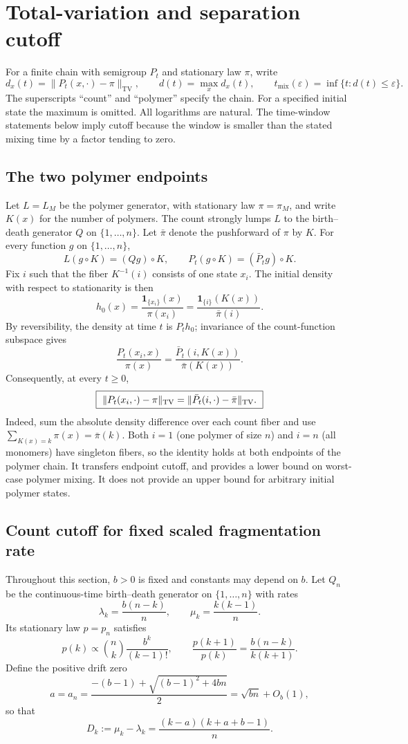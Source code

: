 \section{Total-variation and separation cutoff}\label{sec:count-cutoff}

For a finite chain with semigroup $P_t$ and stationary law $\pi$, write
\[
 d_x(t)=\|P_t(x,\cdot)-\pi\|_{\mathrm{TV}},\qquad
 d(t)=\max_x d_x(t),\qquad
 t_{\mathrm{mix}}(\varepsilon)=\inf\{t:d(t)\le\varepsilon\}.
\]
The superscripts ``count'' and ``polymer'' specify the chain. For a
specified initial state the maximum is omitted. All logarithms are
natural. The time-window statements below imply cutoff because the
window is smaller than the stated mixing time by a factor tending to
zero.

\subsection{The two polymer endpoints}
Let $L=L_M$ be the polymer generator, with stationary law $\pi=\pi_M$,
and write $K(x)$ for the number of polymers. The count strongly lumps
$L$ to the birth--death generator $Q$ on $\{1,\ldots,n\}$. Let $\bar\pi$ denote the pushforward of $\pi$ by $K$.
For every function $g$ on $\{1,\ldots,n\}$,
\[
 L(g\circ K)=(Qg)\circ K,
 \qquad P_t(g\circ K)=(\bar P_tg)\circ K.
\]
Fix $i$ such that the fiber $K^{-1}(i)$ consists of one state $x_i$.
The initial density with respect to stationarity is then
\[
 h_0(x)=\frac{\mathbf1_{\{x_i\}}(x)}{\pi(x_i)}
       =\frac{\mathbf1_{\{i\}}(K(x))}{\bar\pi(i)}.
\]
By reversibility, the density at time $t$ is $P_th_0$; invariance of the
count-function subspace gives
\[
 \frac{P_t(x_i,x)}{\pi(x)}
 =\frac{\bar P_t(i,K(x))}{\bar\pi(K(x))}.
\]
Consequently, at every $t\geq0$,
\[
 \boxed{\ \|P_t(x_i,\cdot)-\pi\|_{\rm TV}
       =\|\bar P_t(i,\cdot)-\bar\pi\|_{\rm TV}.\ }
\]
Indeed, sum the absolute density difference over each count fiber and use
$\sum_{K(x)=k}\pi(x)=\bar\pi(k)$. Both $i=1$ (one polymer of size $n$)
and $i=n$ (all monomers) have singleton fibers, so the identity holds at
both endpoints of the polymer chain. It transfers endpoint cutoff, and
provides a lower bound on worst-case polymer mixing. It does not provide
an upper bound for arbitrary initial polymer states.


\subsection{Count cutoff for fixed scaled fragmentation rate}
Throughout this section, $b>0$ is fixed and constants may depend on $b$.
Let $Q_n$ be the continuous-time birth--death generator on $\{1,\ldots,n\}$
with rates
\[
 \lambda_k=\frac{b(n-k)}n,\qquad \mu_k=\frac{k(k-1)}n.
\]
Its stationary law $p=p_n$ satisfies
\[
 p(k)\propto \binom nk\frac{b^k}{(k-1)!},\qquad
 \frac{p(k+1)}{p(k)}=\frac{b(n-k)}{k(k+1)}.
\]
Define the positive drift zero
\[
 a=a_n=\frac{-(b-1)+\sqrt{(b-1)^2+4bn}}2
       =\sqrt{bn}+O_b(1),
\]
so that
\[
 D_k:=\mu_k-\lambda_k
     =\frac{(k-a)(k+a+b-1)}n.
\]

